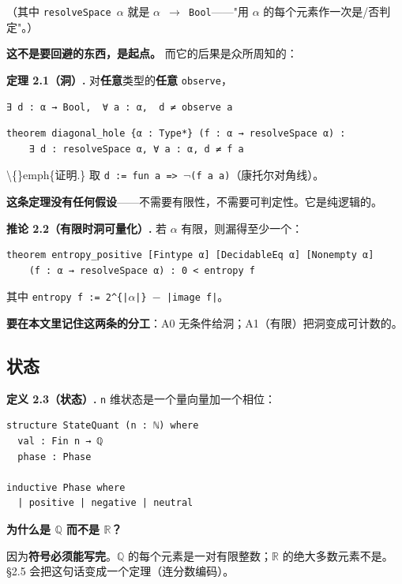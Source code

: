 \documentclass[11pt,a4paper]{ctexart}
\begin{document}
（其中 \texttt{resolveSpace \ensuremath{\alpha}} 就是 \texttt{\ensuremath{\alpha} \ensuremath{\to} Bool}——"用 \ensuremath{\alpha} 的每个元素作一次是/否判定"。）

\textbf{这不是要回避的东西，是起点。} 而它的后果是众所周知的：

\textbf{定理 2.1（洞）.} 对\textbf{任意}类型的\textbf{任意} \texttt{observe}，

\begin{lstlisting}
∃ d : α → Bool,  ∀ a : α,  d ≠ observe a
\end{lstlisting}

\begin{lstlisting}
theorem diagonal_hole {α : Type*} (f : α → resolveSpace α) :
    ∃ d : resolveSpace α, ∀ a : α, d ≠ f a
\end{lstlisting}

\textbackslash\{\}emph\{证明.\} 取 \texttt{d := fun a => \ensuremath{\neg}(f a a)}（康托尔对角线）。

\textbf{这条定理没有任何假设}——不需要有限性，不需要可判定性。它是纯逻辑的。

\textbf{推论 2.2（有限时洞可量化）.} 若 \texttt{\ensuremath{\alpha}} 有限，则漏得至少一个：

\begin{lstlisting}
theorem entropy_positive [Fintype α] [DecidableEq α] [Nonempty α]
    (f : α → resolveSpace α) : 0 < entropy f
\end{lstlisting}

其中 \texttt{entropy f := 2\textasciicircum{}\{|\ensuremath{\alpha}|\} \ensuremath{-} |image f|}。

\textbf{要在本文里记住这两条的分工}：A0 无条件给洞；A1（有限）把洞变成可计数的。

\subsection{状态}

\textbf{定义 2.3（状态）.} \texttt{n} 维状态是一个量向量加一个相位：

\begin{lstlisting}
structure StateQuant (n : ℕ) where
  val : Fin n → ℚ
  phase : Phase

inductive Phase where
  | positive | negative | neutral
\end{lstlisting}

\textbf{为什么是 \ensuremath{\mathbb{Q}} 而不是 \ensuremath{\mathbb{R}}？}

因为\textbf{符号必须能写完}。\ensuremath{\mathbb{Q}} 的每个元素是一对有限整数；\ensuremath{\mathbb{R}} 的绝大多数元素不是。§2.5 会把这句话变成一个定理（连分数编码）。
\end{document}
